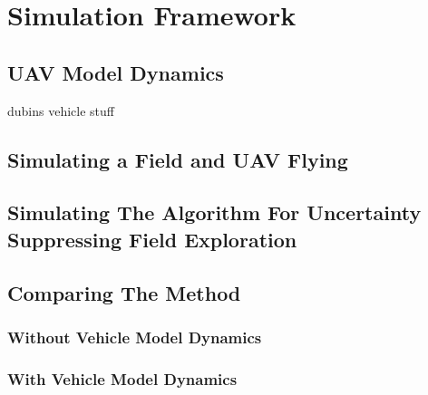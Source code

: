 \chapter{Simulation Framework}
\section{UAV Model Dynamics}
dubins vehicle stuff
\section{Simulating a Field and UAV Flying}
\section{Simulating The Algorithm For Uncertainty Suppressing Field Exploration}

\section{Comparing The Method}
\subsection{Without Vehicle Model Dynamics}
\subsection{With Vehicle Model Dynamics}
